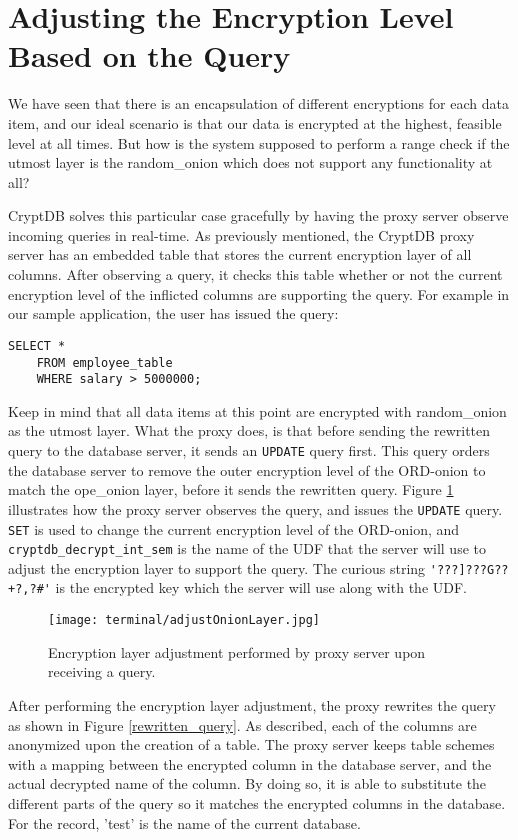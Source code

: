 \section{Adjusting the Encryption Level Based on the Query}
\label{adjust_enc_level}

We have seen that there is an encapsulation of different encryptions for each data item, and our ideal scenario is that our data is encrypted at the highest, feasible level at all times.  But how is the system supposed to perform a range check if the utmost layer is the \gls{random_onion} which does not support any functionality at all?

CryptDB solves this particular case gracefully by having the proxy server observe incoming queries in real-time. As previously mentioned, the CryptDB proxy server has an embedded table that stores the current encryption layer of all columns. After observing a query, it checks this table whether or not the current encryption level of the inflicted columns are supporting the query. For example in our sample application, the user has issued the query:
\begin{verbatim}
SELECT *
	FROM employee_table
	WHERE salary > 5000000;
\end{verbatim}

Keep in mind that all data items at this point are encrypted with \gls{random_onion} as the utmost layer. What the proxy does, is that before sending the rewritten query to the database server, it sends an \verb!UPDATE! query first. This query orders the database server to remove the outer encryption level of the ORD-onion to match the \gls{ope_onion} layer, before it sends the rewritten query. Figure \ref{ope_layer_adjustment} illustrates how the proxy server observes the query, and issues the \verb!UPDATE! query. \verb!SET! is used to change the current encryption level of the ORD-onion, and \verb!cryptdb_decrypt_int_sem! is the name of the UDF that the server will use to adjust the encryption layer to  support the query. The curious string \verb!'???]???G??+?,?#'! is the encrypted key which the server will use along with the UDF.

\begin{figure}[h]
	\texttt{[image: terminal/adjustOnionLayer.jpg]}
	\caption{Encryption layer adjustment performed by proxy server upon receiving a query.}
	\label{ope_layer_adjustment}
\end{figure}

After performing the encryption layer adjustment, the proxy rewrites the query as shown in Figure \ref{rewritten_query}. As described, each of the columns are anonymized upon the creation of a table. The proxy server keeps table schemes with a mapping between the encrypted column in the database server, and the actual decrypted name of the column. By doing so, it is able to substitute the different parts of the query so it matches the encrypted columns in the database. For the record, 'test' is the name of the current database.  

